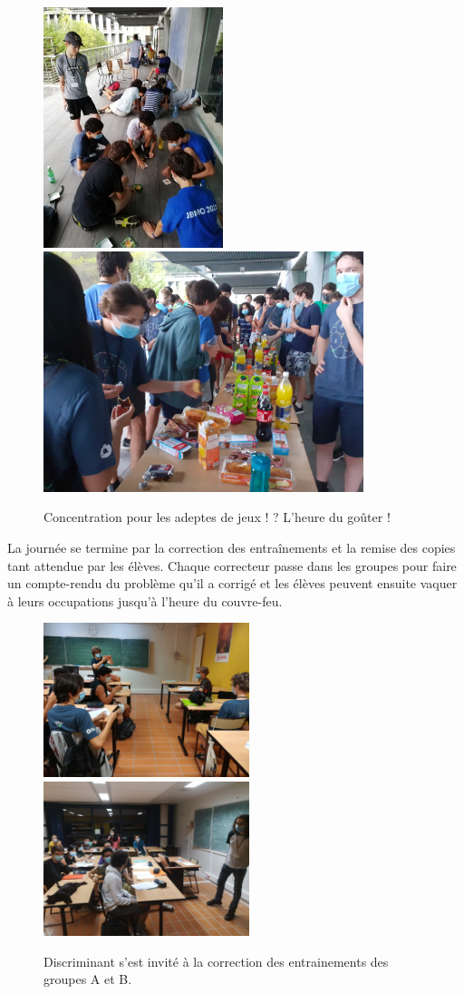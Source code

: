 \begin{figure}[H]
\centering\includegraphics[height=7cm]{CR-24-2.jpg}\hspace{2cm}\includegraphics[height=7cm]{CR-24-3.jpg}
\caption{Concentration pour les adeptes de jeux ! ? L'heure du goûter !}
\end{figure}

La journée se termine par la correction des entraînements et la remise des copies tant attendue par les élèves. Chaque correcteur passe dans les groupes pour faire un compte-rendu du problème qu’il a corrigé et les élèves peuvent ensuite vaquer à leurs occupations jusqu’à l’heure du couvre-feu.

\begin{figure}[H]
\centering\includegraphics[width=6cm]{CR-24-4.jpg}\hspace{2cm}\includegraphics[width=6cm]{CR-24-5.jpg}
\caption{Discriminant s'est invité à la correction des entrainements des groupes A et B.}
\end{figure}